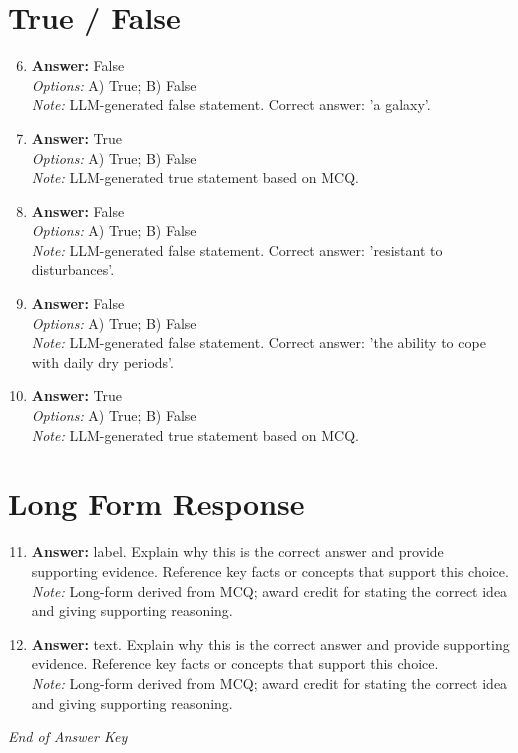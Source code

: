 \documentclass[12pt]{article}
\begin{document}
\section*{True / False}
\begin{enumerate}[label=\arabic*.]
\setcounter{enumi}{5}
\item \textbf{Answer:} False
\\ \textit{Options:} A) True; B) False
\\ \textit{Note:} LLM-generated false statement. Correct answer: 'a galaxy'.
\item \textbf{Answer:} True
\\ \textit{Options:} A) True; B) False
\\ \textit{Note:} LLM-generated true statement based on MCQ.
\item \textbf{Answer:} False
\\ \textit{Options:} A) True; B) False
\\ \textit{Note:} LLM-generated false statement. Correct answer: 'resistant to disturbances'.
\item \textbf{Answer:} False
\\ \textit{Options:} A) True; B) False
\\ \textit{Note:} LLM-generated false statement. Correct answer: 'the ability to cope with daily dry periods'.
\item \textbf{Answer:} True
\\ \textit{Options:} A) True; B) False
\\ \textit{Note:} LLM-generated true statement based on MCQ.
\end{enumerate}

\section*{Long Form Response}
\begin{enumerate}[label=\arabic*.]
\setcounter{enumi}{10}
\item \textbf{Answer:} label. Explain why this is the correct answer and provide supporting evidence. Reference key facts or concepts that support this choice.
\\ \textit{Note:} Long-form derived from MCQ; award credit for stating the correct idea and giving supporting reasoning.
\item \textbf{Answer:} text. Explain why this is the correct answer and provide supporting evidence. Reference key facts or concepts that support this choice.
\\ \textit{Note:} Long-form derived from MCQ; award credit for stating the correct idea and giving supporting reasoning.
\end{enumerate}

\vfill
\noindent\textit{End of Answer Key}
\end{document}
